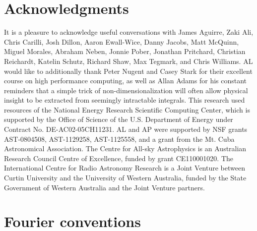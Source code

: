 \documentclass[twocolumn,aps,prd,nofootinbib,showpacs]{revtex4-1}
\begin{document}
\section*{Acknowledgments}
It is a pleasure to acknowledge useful conversations with James Aguirre, Zaki Ali, Chris Carilli, Josh Dillon, Aaron Ewall-Wice, Danny Jacobs, Matt McQuinn, Miguel Morales, Abraham Neben, Jonnie Pober, Jonathan Pritchard, Christian Reichardt, Katelin Schutz, Richard Shaw, Max Tegmark, and Chris Williams.  AL would like to additionally thank Peter Nugent and Casey Stark for their excellent course on high performance computing, as well as Allan Adams for his constant reminders that a simple trick of non-dimensionalization will often allow physical insight to be extracted from seemingly intractable integrals.  This research used resources of the National Energy Research Scientific Computing Center, which is supported by the Office of Science of the U.S. Department of Energy under Contract No. DE-AC02-05CH11231.  AL and AP were supported by NSF grants AST-0804508, AST-1129258, AST-1125558, and a grant from the Mt. Cuba Astronomical Association.  The Centre for All-sky Astrophysics is an Australian Research Council Centre of Excellence, funded by grant CE110001020. The International Centre for Radio Astronomy Research is a Joint Venture between Curtin University and the University of Western Australia, funded by the State Government of Western Australia and the Joint Venture partners.

\appendix
\section{Fourier conventions}
\label{appendix:Fourier}
\end{document}
